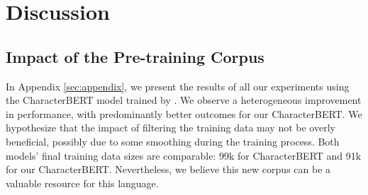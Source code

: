 \documentclass[11pt]{article}
\begin{document}
\section{Discussion}
\subsection{Impact of the Pre-training Corpus}
In Appendix \ref{sec:appendix}, we present the results of all our experiments using the CharacterBERT model trained by \citet{riabi-etal-2021-character}. We observe a heterogeneous improvement in performance, with predominantly better outcomes for our CharacterBERT. We hypothesize that the impact of filtering the training data may not be overly beneficial, possibly due to some smoothing during the training process. Both models' final training data sizes are comparable: 99k for CharacterBERT \cite{riabi-etal-2021-character} and 91k for our CharacterBERT. Nevertheless, we believe this new corpus can be a valuable resource for this language.
\end{document}
